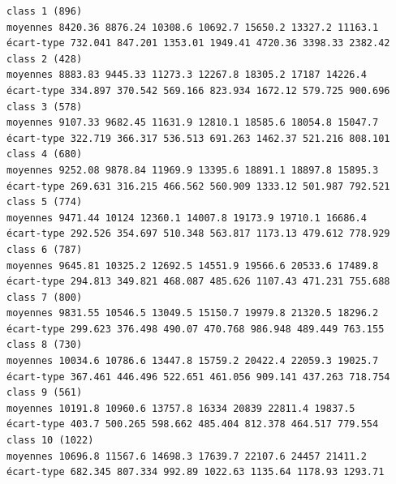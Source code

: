 \documentclass[land,article,submit,pdftex,moreauthors]{Definitions/mdpi}
\begin{document}
\begin{scriptsize}
\begin{verbatim}
class 1 (896)
moyennes 8420.36 8876.24 10308.6 10692.7 15650.2 13327.2 11163.1
écart-type 732.041 847.201 1353.01 1949.41 4720.36 3398.33 2382.42
class 2 (428)
moyennes 8883.83 9445.33 11273.3 12267.8 18305.2 17187 14226.4
écart-type 334.897 370.542 569.166 823.934 1672.12 579.725 900.696
class 3 (578)
moyennes 9107.33 9682.45 11631.9 12810.1 18585.6 18054.8 15047.7
écart-type 322.719 366.317 536.513 691.263 1462.37 521.216 808.101
class 4 (680)
moyennes 9252.08 9878.84 11969.9 13395.6 18891.1 18897.8 15895.3
écart-type 269.631 316.215 466.562 560.909 1333.12 501.987 792.521
class 5 (774)
moyennes 9471.44 10124 12360.1 14007.8 19173.9 19710.1 16686.4
écart-type 292.526 354.697 510.348 563.817 1173.13 479.612 778.929
class 6 (787)
moyennes 9645.81 10325.2 12692.5 14551.9 19566.6 20533.6 17489.8
écart-type 294.813 349.821 468.087 485.626 1107.43 471.231 755.688
class 7 (800)
moyennes 9831.55 10546.5 13049.5 15150.7 19979.8 21320.5 18296.2
écart-type 299.623 376.498 490.07 470.768 986.948 489.449 763.155
class 8 (730)
moyennes 10034.6 10786.6 13447.8 15759.2 20422.4 22059.3 19025.7
écart-type 367.461 446.496 522.651 461.056 909.141 437.263 718.754
class 9 (561)
moyennes 10191.8 10960.6 13757.8 16334 20839 22811.4 19837.5
écart-type 403.7 500.265 598.662 485.404 812.378 464.517 779.554
class 10 (1022)
moyennes 10696.8 11567.6 14698.3 17639.7 22107.6 24457 21411.2
écart-type 682.345 807.334 992.89 1022.63 1135.64 1178.93 1293.71


\end{verbatim}
\end{scriptsize}
\end{document}
